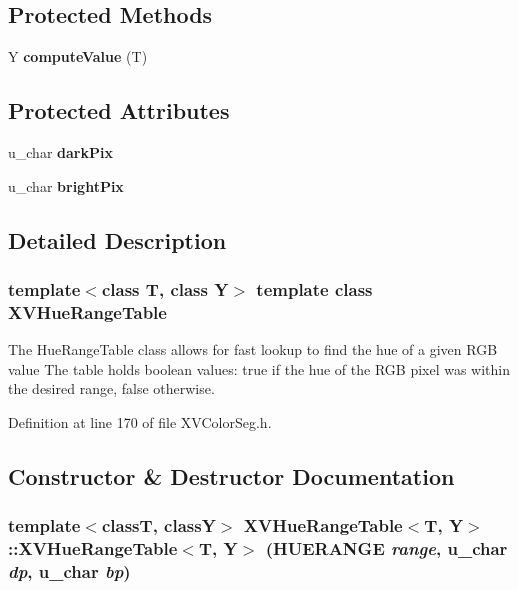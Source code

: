 \subsection*{Protected Methods}
\begin{CompactItemize}
\item 
\label{XVHueRangeTable_b0}
\hypertarget{class_XVHueRangeTable_b0}{
Y {\bf compute\-Value} (T)}

\end{CompactItemize}
\subsection*{Protected Attributes}
\begin{CompactItemize}
\item 
u\_\-char {\bf dark\-Pix}
\item 
u\_\-char {\bf bright\-Pix}
\end{CompactItemize}


\subsection{Detailed Description}
\subsubsection*{template$<$class T, class Y$>$  template class XVHue\-Range\-Table}

The Hue\-Range\-Table class allows for fast lookup to find the hue of a given RGB value The table holds boolean values: true if the hue of the RGB pixel was within the desired range, false otherwise.





Definition at line 170 of file XVColor\-Seg.h.

\subsection{Constructor \& Destructor Documentation}
\label{XVHueRangeTable_a0}
\hypertarget{class_XVHueRangeTable_a0}{
\subsubsection[XVHueRangeTable]{\setlength{\rightskip}{0pt plus 5cm}template$<$classT, classY$>$ XVHue\-Range\-Table$<$T, Y$>$::XVHue\-Range\-Table$<$T, Y$>$ (HUERANGE {\em range}, u\_\-char {\em dp}, u\_\-char {\em bp})}}




